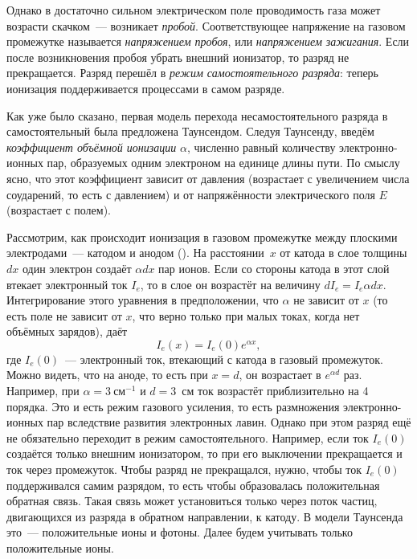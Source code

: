 Однако в достаточно сильном электрическом поле проводимость газа может возрасти скачком~--- возникает \textit{пробой}.
Соответствующее напряжение на газовом промежутке называется \textit{напряжением пробоя}, или \textit{напряжением зажигания}.
Если после возникновения пробоя убрать внешний ионизатор, то разряд не прекращается. Разряд перешёл в \textit{режим
самостоятельного разряда}: теперь ионизация поддерживается процессами в самом разряде.


Как уже было сказано, первая модель перехода несамостоятельного разряда в самостоятельный была предложена Таунсендом.
Следуя Таунсенду, введём \textit{коэффициент объёмной ионизации} $\alpha$, численно равный количеству электронно-ионных
пар, образуемых одним электроном на единице длины пути. По смыслу ясно, что этот коэффициент зависит от давления
(возрастает с увеличением числа соударений, то есть с давлением) и от напряжённости электрического поля $E$ (возрастает
с полем).

Рассмотрим, как происходит ионизация в газовом промежутке между плоскими электродами~--- катодом и анодом (). На
расстоянии~$x$ от катода в слое толщины $dx$ один электрон создаёт $\alpha dx$ пар ионов. Если со стороны катода в этот
слой втекает электронный ток $I_e$, то в слое он возрастёт на величину $dI_e=I_e\alpha dx$. Интегрирование этого
уравнения в предположении, что $\alpha$ не зависит от $x$ (то есть поле не зависит от $x$, что верно только при малых
токах, когда нет объёмных зарядов), даёт
\[
I_e(x)=I_e(0)e^{\alpha x},
\]
где $I_e(0)$~--- электронный ток, втекающий с катода в газовый промежуток. Можно видеть, что на аноде, то есть
при $x=d$, он возрастает в $e^{\alpha d}$ раз. Например, при $\alpha=3~см^{-1}$ и $d=3$~см ток возрастёт приблизительно
на 4 порядка. Это и есть режим газового усиления, то есть размножения электронно-ионных пар вследствие развития
электронных лавин. Однако при этом разряд ещё не обязательно переходит в режим самостоятельного. Например, если ток
$I_e(0)$ создаётся только внешним ионизатором, то при его выключении прекращается и ток через промежуток. Чтобы разряд
не прекращался, нужно, чтобы ток $I_e(0)$ поддерживался самим разрядом, то есть чтобы образовалась положительная
обратная связь. Такая связь может установиться только через поток частиц, двигающихся из разряда в обратном направлении,
к катоду. В модели Таунсенда это~--- положительные ионы и фотоны. Далее будем учитывать только положительные ионы.

